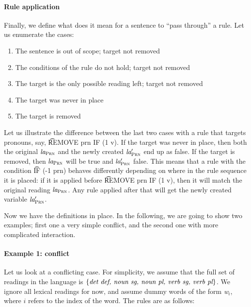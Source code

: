 \paragraph{Rule application}
Finally, we define what does it mean for a sentence to ``pass through'' a rule. 
Let us enumerate the cases:
\begin{enumerate}
\item The sentence is out of scope; target not removed
\item The conditions of the rule do not hold; target not removed
\item The target is the only possible reading left; target not removed
\item The target was never in place
\item The target is removed
\end{enumerate}
Let us illustrate the difference between the last two cases with a rule that targets pronouns, say, \t{REMOVE prn IF (1 v)}. 
If the target was never in place, then both the original $\text{\em la}_{\text{\sc Prn}}$ and the newly created $\text{\em la}{}'_{\text{\sc Prn}}$ end up as false. 
If the target is removed, then $\text{\em la}_{\text{\sc Prn}}$ will be true and $\text{\em la}{}'_{\text{\sc Prn}}$ false.
This means that a rule with the condition \t{IF (-1 prn)} behaves differently depending on where in the rule sequence it is placed: 
if it is applied before \t{REMOVE prn IF (1 v)}, then it will match the original reading $\text{\em la}_{\text{\sc Prn}}$. Any rule applied after that will get the newly created variable $\text{\em la}{}'_{\text{\sc Prn}}$.


Now we have the definitions in place. In the following, we are going to show two examples; first one a very simple conflict, and the second one with more complicated interaction.


\paragraph{Example 1: conflict}

Let us look at a conflicting case. For simplicity, we assume that the full set of readings in the language is $\{ \emph{det def, noun sg, noun pl, verb sg, verb pl} \}$. We ignore all lexical readings for now, and assume dummy words of the form \emph{w$_{i}$}, where $i$ refers to the index of the word.
The rules are as follows:



